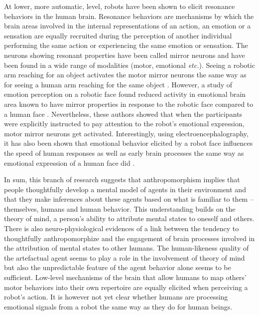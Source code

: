\documentclass{frontiersSCNS} %
\newcommand{\etc}{\textit{etc.}\xspace}
\begin{document}
At lower, more automatic, level, robots have been shown to elicit resonance
behaviors in the human brain. Resonance behaviors \citep{Rizzolatti1999} are
mechanisms by which the brain areas involved in the internal representations of
an action, an emotion or a sensation are equally recruited during the perception
of another individual performing the same action or experiencing the same
emotion or sensation.  The neurons showing resonant properties have been called
mirror neurons and have been found in a wide range of modalities (motor,
emotional \etc). Seeing a robotic arm reaching for an object
activates the motor mirror neurons the same way as for seeing a human arm
reaching for the same object \citep{Gazzola2007, oberman_eeg_2007}. However, a
study of emotion perception on a robotic face found reduced activity in
emotional brain area known to have mirror properties in response to the robotic
face compared to a human face \citep{Chaminade2010}. Nevertheless, these authors
showed that when the participants were explicitly instructed to pay attention to
the robot's emotional expression, motor mirror neurons get activated.
Interestingly, using electroencephalography,  it has also been shown that
emotional behavior elicited by a robot face influences the speed of human
responses as well as early brain processes the same way as emotional expression
of a human face did \citep{Dubal2010}.


%


In sum, this branch of research suggests that anthropomorphism implies that
people thoughtfully develop a mental model of agents in their environment and
that they make inferences about these agents based on what is familiar to them
-- themselves, humans and human behavior. This understanding builds on the
theory of mind,  a person's ability to attribute mental states to oneself and
others.  There is also  neuro-physiological evidences of a link between the
tendency to thoughtfully anthropomorphize and the engagement of brain processes
involved in the attribution of mental states to other humans. The human-likeness
quality of the artefactual agent seems to play a role in the involvement of
theory of mind but also the unpredictable feature of the agent behavior alone
seems to be sufficient. Low-level mechanisms of the brain that allow humans to
map others' motor behaviors into their own repertoire are equally elicited when
perceiving a robot's action. It is however not yet clear whether humans are processing
emotional signals from a robot the same way as they do for human beings. 
\end{document}
